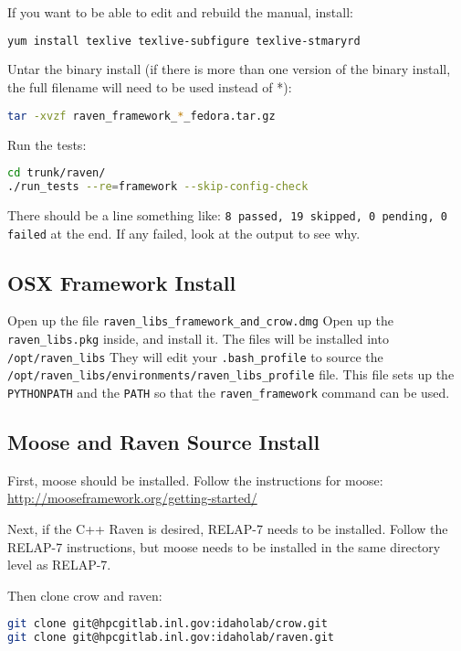 If you want to be able to edit and rebuild the manual, install:
\begin{lstlisting}[language=bash]
yum install texlive texlive-subfigure texlive-stmaryrd
\end{lstlisting}

Untar the binary install (if there is more than one version of the
binary install, the full filename will need to be used instead of *):

\begin{lstlisting}[language=bash]
tar -xvzf raven_framework_*_fedora.tar.gz
\end{lstlisting}

Run the tests:

\begin{lstlisting}[language=bash]
cd trunk/raven/
./run_tests --re=framework --skip-config-check
\end{lstlisting}

There should be a line something like:
{\tt 8 passed, 19 skipped, 0 pending, 0 failed}
at the end.  If any failed, look at the output to see why.

\subsection{OSX Framework Install}

Open up the file \verb'raven_libs_framework_and_crow.dmg' Open up the
\verb'raven_libs.pkg' inside, and install it.  The files will be
installed into \verb'/opt/raven_libs' They will edit your
\verb'.bash_profile' to source the
\verb'/opt/raven_libs/environments/raven_libs_profile' file.  This
file sets up the \verb'PYTHONPATH' and the \verb'PATH' so that the
\verb'raven_framework' command can be used.

\subsection{Moose and Raven Source Install}

First, moose should be installed.  Follow the instructions for moose:
\url{http://mooseframework.org/getting-started/}

Next, if the C++ Raven is desired, RELAP-7 needs to be installed.
Follow the RELAP-7 instructions, but moose needs to be installed
in the same directory level as RELAP-7.

Then clone crow and raven:

\begin{lstlisting}[language=bash]
git clone git@hpcgitlab.inl.gov:idaholab/crow.git
git clone git@hpcgitlab.inl.gov:idaholab/raven.git
\end{lstlisting}

